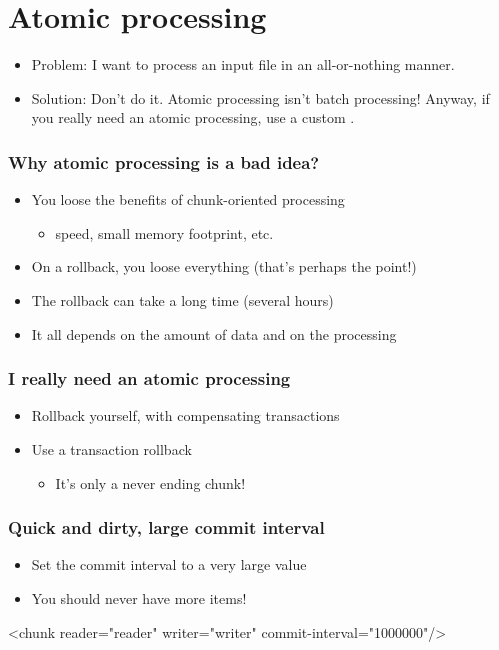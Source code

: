 \section{Atomic processing}

\begin{frame}
 \begin{itemize}
  \item Problem: I want to process an input file in an all-or-nothing manner.
  \item Solution: Don't do it. Atomic processing isn't batch processing! Anyway, if you really need 
  an atomic processing, use a custom .
 \end{itemize}
\end{frame}

\begin{frame}
 \frametitle{Why atomic processing is a bad idea?}
 \begin{itemize}
  \item You loose the benefits of chunk-oriented processing
  \begin{itemize}
    \item speed, small memory footprint, etc.
  \end{itemize}
  \item On a rollback, you loose everything (that's perhaps the point!)
  \item The rollback can take a long time (several hours)
  \item It all depends on the amount of data and on the processing
 \end{itemize}
\end{frame}

\begin{frame}
 \frametitle{I really need an atomic processing}
 \begin{itemize}
  \item Rollback yourself, with compensating transactions  
  \item Use a transaction rollback
  \begin{itemize}
    \item It's only a never ending chunk!
  \end{itemize}
 \end{itemize}
\end{frame}

\begin{frame}[fragile]
 \frametitle{Quick and dirty, large commit interval}
 \begin{itemize}
  \item Set the commit interval to a very large value  
  \item You should never have more items!
 \end{itemize}
\begin{xmlcode}
<chunk reader="reader" writer="writer" commit-interval="1000000"/>
\end{xmlcode}
\end{frame}

